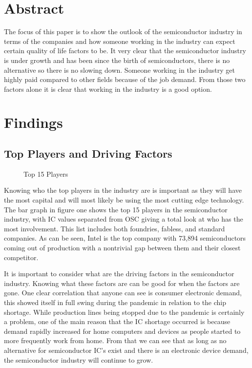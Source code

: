 \documentclass{article}
\begin{document}
\section*{Abstract}

The focus of this paper is to show the outlook of the semiconductor industry in terms of the companies and how someone working in the industry can expect certain quality of life factors to be. It very clear that the semiconductor industry is under growth and has been since the birth of semiconductors, there is no alternative so there is no slowing down. Someone working in the industry get highly paid compared to other fields because of the job demand. From those two factors alone it is clear that working in the industry is a good option.
\section*{Findings}
\subsection*{Top Players and Driving Factors}
\begin{figure}
  \begin{center}
  \end{center}
  \caption{Top 15 Players}
\end{figure}
Knowing who the top players in the industry are is important as they will have the most capital and will most likely be using the most cutting edge technology. The bar graph in figure one shows the top 15 players in the semiconductor industry, with IC values separated from OSC giving a total look at who has the most involvement. This list includes both foundries, fabless, and standard companies. As can be seen, Intel is the top company with 73,894 semiconductors coming out of production with a nontrivial gap between them and their closest competitor.

It is important to consider what are the driving factors in the semiconductor industry. Knowing what these factors are can be good for when the factors are gone. One clear correlation that anyone can see is consumer electronic demand, this showed itself in full swing during the pandemic in relation to the chip shortage. While production lines being stopped due to the pandemic is certainly a problem, one of the main reason that the IC shortage occurred is because demand rapidly increased for home computers and devices as people started to more frequently work from home. From that we can see that as long as no alternative for semiconductor IC's exist and there is an electronic device demand, the semiconductor industry will continue to grow.
\end{document}
